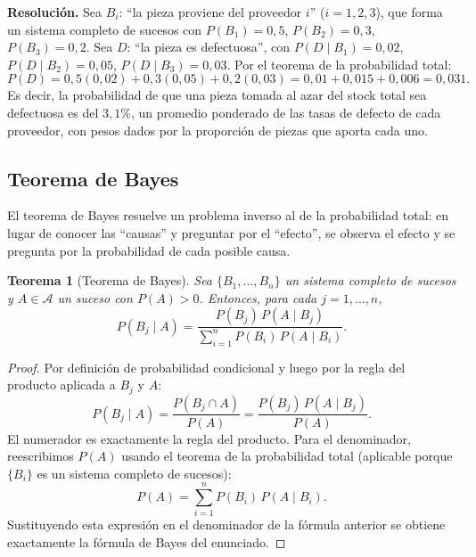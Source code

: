 \documentclass[11pt,a4paper]{article}
\theoremstyle{plain}
\newtheorem{teorema}{Teorema}[section]
\theoremstyle{definition}
\theoremstyle{remark}
\begin{document}
\textbf{Resolución.} Sea $B_i$: ``la pieza proviene del proveedor $i$'' ($i=1,2,3$), que forma un sistema completo de sucesos con $P(B_1)=0{,}5$, $P(B_2)=0{,}3$, $P(B_3)=0{,}2$. Sea $D$: ``la pieza es defectuosa'', con $P(D\mid B_1)=0{,}02$, $P(D\mid B_2)=0{,}05$, $P(D\mid B_3)=0{,}03$. Por el teorema de la probabilidad total:
\[
P(D) = 0{,}5(0{,}02)+0{,}3(0{,}05)+0{,}2(0{,}03) = 0{,}01+0{,}015+0{,}006 = 0{,}031.
\]
Es decir, la probabilidad de que una pieza tomada al azar del stock total sea defectuosa es del $3{,}1\%$, un promedio ponderado de las tasas de defecto de cada proveedor, con pesos dados por la proporción de piezas que aporta cada uno.

\subsection{Teorema de Bayes}

El teorema de Bayes resuelve un problema inverso al de la probabilidad total: en lugar de conocer las ``causas'' y preguntar por el ``efecto'', se observa el efecto y se pregunta por la probabilidad de cada posible causa.

\begin{teorema}[Teorema de Bayes]
Sea $\{B_1,\dots,B_n\}$ un sistema completo de sucesos y $A\in\mathcal{A}$ un suceso con $P(A)>0$. Entonces, para cada $j=1,\dots,n$,
\[
P(B_j \mid A) = \frac{P(B_j)\,P(A\mid B_j)}{\displaystyle\sum_{i=1}^{n} P(B_i)\,P(A\mid B_i)}.
\]
\end{teorema}

\begin{proof}
Por definición de probabilidad condicional y luego por la regla del producto aplicada a $B_j$ y $A$:
\[
P(B_j\mid A) = \frac{P(B_j\cap A)}{P(A)} = \frac{P(B_j)\,P(A\mid B_j)}{P(A)}.
\]
El numerador es exactamente la regla del producto. Para el denominador, reescribimos $P(A)$ usando el teorema de la probabilidad total (aplicable porque $\{B_i\}$ es un sistema completo de sucesos):
\[
P(A) = \sum_{i=1}^n P(B_i)\,P(A\mid B_i).
\]
Sustituyendo esta expresión en el denominador de la fórmula anterior se obtiene exactamente la fórmula de Bayes del enunciado.
\end{proof}
\end{document}

